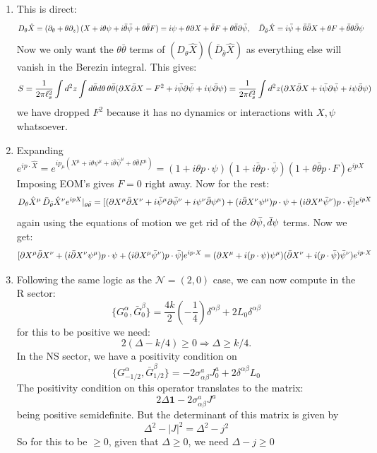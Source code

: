 \documentclass[11pt]{article}
\begin{document}
\begin{enumerate}
	\item This is direct:
	\[
	\begin{aligned}
		D_\theta \hat X &= \left(\partial_\theta + \theta \partial_z \right) (X + i \theta \psi + i \bar \theta \bar \psi + \theta \bar \theta F) = i \psi + \theta \partial X + \bar \theta F + \theta \bar \theta \partial \bar \psi, \quad \bar D_{\bar \theta} \hat X = i \bar \psi + \bar \theta \bar {\partial} X + \theta F + \bar \theta \theta \bar {\partial} \psi
	\end{aligned}
	\]
	Now we only want the $\theta \bar \theta$ terms of $(D_\theta \hat X)(\bar D_{\bar \theta} \hat X)$ as everything else will vanish in the Berezin integral. This gives:
	\[
		S= \frac{1}{2\pi \ell_s^2} \int d^2 z \int d\bar \theta d \theta \, \theta \bar \theta (\partial X \bar {\partial} X - F^2 + i \bar \psi \partial \bar \psi + i \psi \bar {\partial} \psi) = \frac{1}{2\pi \ell_s^2} \int d^2 z (\partial X \bar {\partial} X + i \bar \psi \partial \bar \psi + i \psi \bar {\partial} \psi)
	\]
	we have dropped $F^2$ because it has no dynamics or interactions with $X, \psi$ whatsoever. 
	
	\item Expanding 
	\[
		e^{i p \cdot \hat X} = e^{i p_\mu (X^\mu + i \theta \psi^\mu + i \bar \theta \bar \psi^\mu + \theta \bar \theta F^\mu)} = (1 + i \theta p \cdot \psi) (1+ i \bar \theta p \cdot \bar \psi) (1+ \theta \bar \theta p \cdot F) e^{i p X} 
	\]
	Imposing EOM's gives $F = 0$ right away. Now for the rest:
	\[
		D_\theta \hat X^\mu \, \bar D_{\bar \theta} \hat X^\nu e^{i p X}|_{\theta \bar \theta}= [(\partial X^\mu \bar {\partial} X^\nu + i \bar \psi^\mu \partial \bar \psi^\nu + i \psi^\nu \bar {\partial} \psi^\mu) + (i \bar {\partial} X^\nu \psi^\mu)  p \cdot \psi + (i \partial X^\mu \bar \psi^\nu) p \cdot \bar \psi] e^{i p X}
	\]
	again using the equations of motion we get rid of the $\partial \bar \psi, \bar d \psi$ terms. Now we get:
	\[
		[\partial X^\mu \bar {\partial} X^\nu + (i \bar {\partial} X^\nu \psi^\mu)  p \cdot \psi + (i \partial X^\mu \bar \psi^\nu) p \cdot \bar \psi] e^{i p \cdot X} = (\partial X^\mu + i (p \cdot \psi) \psi^\mu) (\bar {\partial} X^\nu + i (p \cdot \bar \psi) \bar \psi^\nu) e^{i p \cdot X}
	\]
	\item Following the same logic as the $\mathcal{N} = (2,0)$ case, we can now compute in the R sector:
	\[
		\{G_0^\alpha, \bar G_0^\beta\} = \frac{4 k}{2} \left(- \frac14 \right) \delta^{\alpha \beta} + 2 L_0 \delta^{\alpha \beta}
	\]
	for this to be positive we need:
	\[
		2 (\Delta - k/4) \geq 0 \Rightarrow \Delta \geq k/4.
	\]
	In the NS sector, we have a positivity condition on
	\[
		\{G_{-1/2}^\alpha, \bar G_{1/2}^\beta\} = -2 \sigma^a_{\alpha \beta} J^a_0 + 2 \delta^{\alpha \beta} L_0
	\]
	The positivity condition on this operator translates to the matrix:
	\[
		2 \Delta \mathbf{1} - 2 \sigma^a_{\alpha \beta} J^a
	\]
	being positive semidefinite. But the determinant of this matrix is given by
	\[
		\Delta^2 - |J|^2 = \Delta^2 - j^2
	\]
	So for this to be $\geq 0$, given that $\Delta \geq 0$, we need $\Delta - j \geq 0$
	

\end{enumerate}
\end{document}
